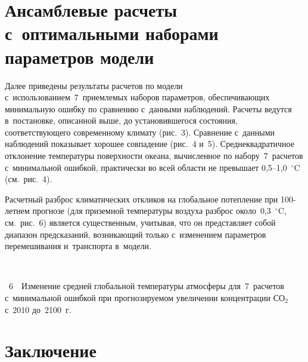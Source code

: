 \begin{multicols}{2}
\vspace*{-7pt}
  
\section{Ансамблевые расчеты с~оптимальными наборами 
параметров модели}

\vspace*{-3pt}
 
  Далее приведены результаты расчетов по модели 
с~использованием~7~приемлемых наборов па\-ра\-мет\-ров, обеспечивающих 
минимальную ошибку по сравнению с~данными наблюдений. Расчеты ведутся 
в~постановке, описанной выше, до установившегося состояния, 
соответствующего современному климату (рис.~3). Сравнение с~данными 
наблюдений показывает хорошее совпадение (рис.~4 и~5). Среднеквадратичное 
отклонение температуры поверхности океана, вычисленное по 
набору~7~расчетов с~минимальной ошибкой, практически во всей области не 
превышает 0,5--1,0~$^\circ$C (см.\ рис.~4).


  
  Расчетный разброс климатических откликов на глобальное потепление при 
100-лет\-нем прогнозе (для приземной температуры воздуха разброс 
около~0,3~$^\circ$C, см.\ рис.~6) является существенным, учитывая, что он 
представляет собой диапазон предсказаний, возникающий только с~изменением 
парамет\-ров перемешивания и~транспорта в~модели.
{ %

}

 { \begin{center}  %
 \vspace*{18pt}
 \mbox{%
\epsfxsize=78.036mm
}
\end{center}



\noindent
{{\figurename~6}\ \ \small{Изменение средней глобальной температуры атмосферы для~7~расчетов 
с~минимальной ошибкой при прогнозируемом увеличении концентрации СО$_2$ с~2010 
до~2100~г.}}
}



  
\section{Заключение}

\vspace*{-2pt}


\end{multicols}
